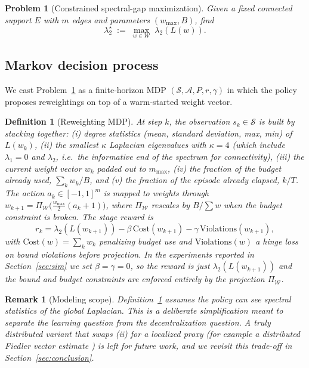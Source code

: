 \documentclass[letterpaper, 11 pt, journal, twoside]{IEEEtran}
\newtheorem{problem}{Problem}
\newtheorem{remark}{Remark}
\newtheorem{definition}{Definition}
\begin{document}
\begin{problem}[Constrained spectral-gap maximization]
\label{prob:lambda2}
Given a fixed connected support $E$ with $m$ edges and parameters
$(w_{\max}, B)$, find
\begin{equation}
\lambda_2^\star \;:=\; \max_{w \in \mathcal{W}} \; \lambda_2(L(w)).
\label{eq:primal-top}
\end{equation}
\end{problem}

\subsection{Markov decision process}
We cast Problem~\ref{prob:lambda2} as a finite-horizon MDP
$(\mathcal{S},\mathcal{A},P,r,\gamma)$ in which the policy proposes
reweightings on top of a warm-started weight vector.

\begin{definition}[Reweighting MDP]
\label{def:mdp}
At step $k$, the observation $s_k \in \mathcal{S}$ is built by
stacking together: (i) degree statistics (mean, standard deviation,
max, min) of $L(w_k)$, (ii) the smallest $\kappa$ Laplacian
eigenvalues with $\kappa = 4$ (which include $\lambda_1 = 0$ and
$\lambda_2$, i.e.\ the informative end of the spectrum for
connectivity), (iii) the current weight vector $w_k$ padded out to
$m_{\max}$, (iv) the fraction of the budget already used,
$\sum_k w_k / B$, and (v) the fraction of the episode already
elapsed, $k/T$. The action $a_k \in [-1,1]^m$ is mapped to weights
through
$w_{k+1} = \Pi_\mathcal{W}\!\big(\tfrac{w_{\max}}{2}(a_k + 1)\big)$,
where $\Pi_\mathcal{W}$ rescales by $B / \sum w$ when the budget
constraint is broken. The stage reward is
\begin{equation}
r_k = \lambda_2(L(w_{k+1})) - \beta\,\mathrm{Cost}(w_{k+1}) - \gamma\,\mathrm{Violations}(w_{k+1}),
\label{eq:reward}
\end{equation}
with $\mathrm{Cost}(w) = \sum_k w_k$ penalizing budget use and
$\mathrm{Violations}(w)$ a hinge loss on bound violations before
projection. In the experiments reported in
Section~\ref{sec:sim} we set $\beta = \gamma = 0$, so the reward is
just $\lambda_2(L(w_{k+1}))$ and the bound and budget constraints
are enforced entirely by the projection $\Pi_\mathcal{W}$.
\end{definition}

\begin{remark}[Modeling scope]
\label{rem:scope}
Definition~\ref{def:mdp} assumes the policy can see spectral
statistics of the \emph{global} Laplacian. This is a deliberate
simplification meant to separate the learning question from the
decentralization question. A truly distributed variant that swaps
(ii) for a localized proxy (for example a distributed Fiedler vector
estimate \cite{YangFreeman2010,SabattiniEtAl2013}) is left for
future work, and we revisit this trade-off in
Section~\ref{sec:conclusion}.
\end{remark}
\end{document}
